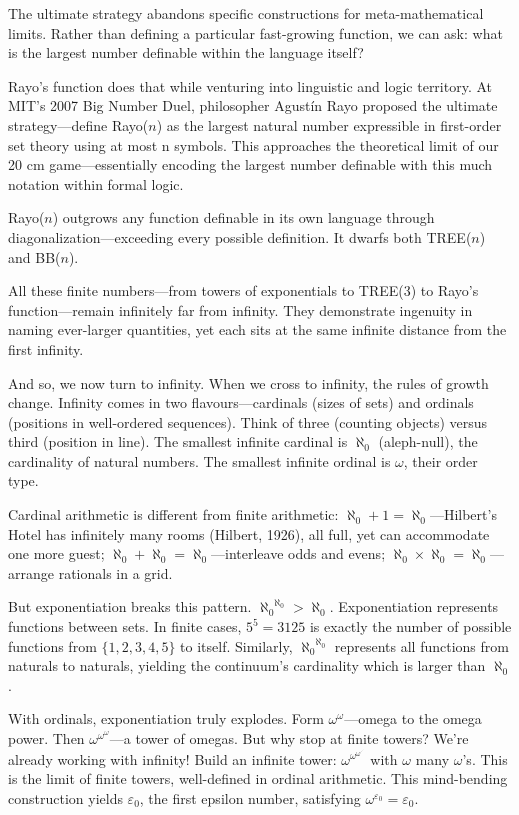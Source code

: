 The ultimate strategy abandons specific constructions for meta-mathematical limits. Rather than defining a particular fast-growing function, we can ask: what is the largest number definable within the language itself?

Rayo's function does that while venturing into linguistic and logic territory. At MIT's 2007 \QENOpen{}Big Number Duel,\QENClose{} philosopher Agustín Rayo proposed the ultimate strategy—define Rayo($n$) as the largest natural number expressible in first-order set theory using at most n symbols. This approaches the theoretical limit of our 20 cm game—essentially encoding \QENOpen{}the largest number definable with this much notation\QENClose{} within formal logic. 

Rayo($n$) outgrows any function definable in its own language through diagonalization—exceeding every possible definition. It dwarfs both TREE($n$) and BB($n$).

All these finite numbers—from towers of exponentials to TREE(3) to Rayo's function—remain infinitely far from infinity. They demonstrate ingenuity in naming ever-larger quantities, yet each sits at the same infinite distance from the first infinity.

And so, we now turn to infinity. When we cross to infinity, the rules of growth change. Infinity comes in two flavours—cardinals (sizes of sets) and ordinals (positions in well-ordered sequences). Think of \QSOpen{}three\QSClose{} (counting objects) versus \QSOpen{}third\QSClose{} (position in line). The smallest infinite cardinal is $\aleph_0$ (aleph-null), the cardinality of natural numbers. The smallest infinite ordinal is $\omega$, their order type.

Cardinal arithmetic is different from finite arithmetic: $\aleph_0 + 1 = \aleph_0$—Hilbert's Hotel has infinitely many rooms (Hilbert, 1926), all full, yet can accommodate one more guest; $\aleph_0 + \aleph_0 = \aleph_0$—interleave odds and evens; $\aleph_0 \times \aleph_0 = \aleph_0$—arrange rationals in a grid.

But exponentiation breaks this pattern. ${\aleph_0}^{\aleph_0} > \aleph_0$. Exponentiation represents functions between sets. In finite cases, $5^5 = 3125$ is exactly the number of possible functions from $\{1,2,3,4,5\}$ to itself. Similarly, ${\aleph_0}^{\aleph_0}$ represents all functions from naturals to naturals, yielding the continuum's cardinality which is larger than $\aleph_0$. 

With ordinals, exponentiation truly explodes. Form $\omega^\omega$—omega to the omega power. Then $\omega^{\omega^\omega}$—a tower of omegas. But why stop at finite towers? We're already working with infinity! Build an infinite tower: $\omega^{\omega^{\omega^{\cdot^{\cdot^{\cdot}}}}}$ with $\omega$ many $\omega$'s. This is the limit of finite towers, well-defined in ordinal arithmetic. This mind-bending construction yields $\varepsilon_0$, the first epsilon number, satisfying $\omega^{\varepsilon_0} = \varepsilon_0$.

